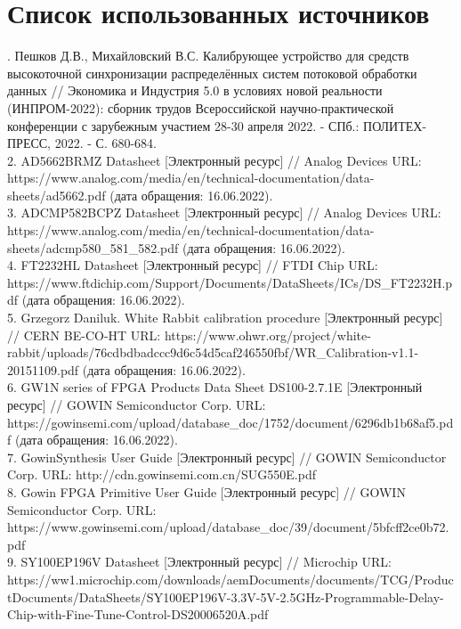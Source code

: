 \clearpage                                  %
\chapter*{Список использованных источников}
\label{references}
\printbibliography[env=SSTfirst] 
. Пешков Д.В., Михайловский В.С. Калибрующее устройство для средств высокоточной синхронизации распределённых систем потоковой обработки данных // Экономика и Индустрия 5.0 в условиях новой реальности (ИНПРОМ-2022): сборник трудов Всероссийской научно-практической конференции с зарубежным участием 28-30 апреля 2022. - СПб.: ПОЛИТЕХ-ПРЕСС, 2022. - С. 680-684.\\
2. AD5662BRMZ Datasheet [Электронный ресурс] // Analog Devices URL: https://www.analog.com/media/en/technical-documentation/data-sheets/ad5662.pdf (дата обращения: 16.06.2022).\\
3. ADCMP582BCPZ Datasheet [Электронный ресурс] // Analog Devices URL: https://www.analog.com/media/en/technical-documentation/data-sheets/adcmp580\_581\_582.pdf (дата обращения: 16.06.2022).\\
4. FT2232HL Datasheet [Электронный ресурс] // FTDI Chip URL: https://www.ftdichip.com/Support/Documents/DataSheets/ICs/DS\_FT2232H.pdf (дата обращения: 16.06.2022).\\
5. Grzegorz Daniluk. White Rabbit calibration procedure [Электронный ресурс] // CERN BE-CO-HT URL: https://www.ohwr.org/project/white-rabbit/uploads/76cdbdbadccc9d6c54d5caf246550fbf/WR\_Calibration-v1.1-20151109.pdf (дата обращения: 16.06.2022).\\
6. GW1N series of FPGA Products Data Sheet DS100-2.7.1E [Электронный ресурс] // GOWIN Semiconductor Corp. URL: https://gowinsemi.com/upload/database\_doc/1752/document/6296db1b68af5.pdf (дата обращения: 16.06.2022).\\
7. GowinSynthesis User Guide [Электронный ресурс] // GOWIN Semiconductor Corp. URL: http://cdn.gowinsemi.com.cn/SUG550E.pdf\\
8. Gowin FPGA Primitive User Guide [Электронный ресурс] // GOWIN Semiconductor Corp. URL: https://www.gowinsemi.com/upload/database\_doc/39/document/5bfcff2ce0b72.pdf\\
9. SY100EP196V Datasheet [Электронный ресурс] // Microchip URL: https://ww1.microchip.com/downloads/aemDocuments/documents/TCG/ProductDocuments/DataSheets/SY100EP196V-3.3V-5V-2.5GHz-Programmable-Delay-Chip-with-Fine-Tune-Control-DS20006520A.pdf \\
